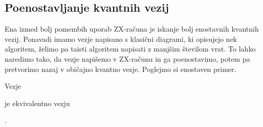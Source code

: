 \documentclass[mat1]{fmfdelo}
\begin{document}
\subsection{Poenostavljanje kvantnih vezij}
Ena izmed bolj pomembih uporab ZX-računa je iskanje bolj enostavnih kvantnih vezij. Ponavadi imamo vezje napisano s klasični diagrami, ki opisujejo nek algoritem, želimo pa taisti algoritem napisati z manjšim številom vrat. To lahko naredimo tako, da vezje napišemo v ZX-računu in ga poenostavimo, potem pa pretvorimo nazaj v običajno kvantno vezje. Poglejmo si enostaven primer.
\begin{izrek}
    Vezje
    \begin{center}
    \end{center}
    je ekvivalentno vezju
    \begin{center}
    \end{center}.
\end{izrek}
\end{document}

